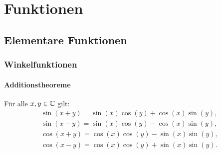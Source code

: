 
\chapter{Funktionen}
\section{Elementare Funktionen}
\subsection{Winkelfunktionen}
\subsubsection{Additionstheoreme}

Für alle $x,y\in\mathbb C$ gilt:
\begin{gather}
\sin(x+y) = \sin(x)\cos(y)+\cos(x)\sin(y),\\
\sin(x-y) = \sin(x)\cos(y)-\cos(x)\sin(y),\\
\cos(x+y) = \cos(x)\cos(y)-\sin(x)\sin(y),\\
\cos(x-y) = \cos(x)\cos(y)+\sin(x)\sin(y).
\end{gather}
